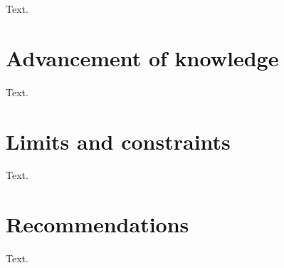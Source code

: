\label{sec:Conclusion}
Text.

\section{Advancement of knowledge}
Text.

\section{Limits and constraints}\label{sec:Limits and constraints}
Text.

\section{Recommendations}
Text.
